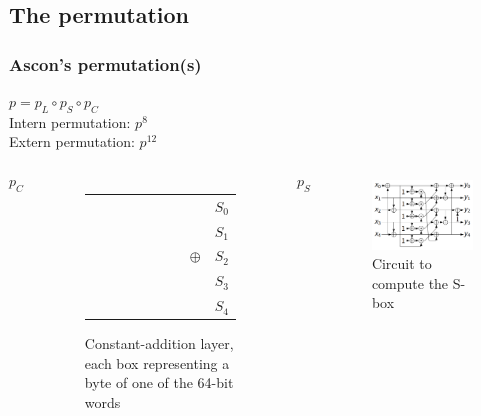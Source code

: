 \documentclass{beamer}
\begin{document}
	\subsection{The permutation}
	\begin{frame}
		\frametitle{Ascon's permutation(s)}
		$p = p_L \circ p_S \circ p_C$\\
		Intern permutation: $p^8$\\
		Extern permutation: $p^{12}$
		
		\begin{columns}
			$$p_C$$
			
			\begin{figure}
				{\tiny 
					\raggedleft
				\begin{tabularx}{0.1\textwidth}{|*{8}{p{0.01cm}|}X}
					\cline{1-8}
					&&&&&&&&$S_0$\\
					\cline{1-8}
					&&&&&&&&$S_1$\\
					\cline{1-8}
					&&&&&&& \normalsize $\oplus$&$S_2$\\
					\cline{1-8}
					&&&&&&&&$S_3$\\
					\cline{1-8}
					&&&&&&&&$S_4$\\
					\cline{1-8}
				\end{tabularx}}
				\caption{Constant-addition layer, each box representing a byte of one of the 64-bit words{}}
			\end{figure} 
			
			$$p_S$$
			\begin{figure}
				\includegraphics[scale=0.2]{circuit}
				\caption{Circuit to compute the S-box}
				\label{circuit_sbox}
			\end{figure}
			

\end{columns}
\end{frame}
\end{document}

